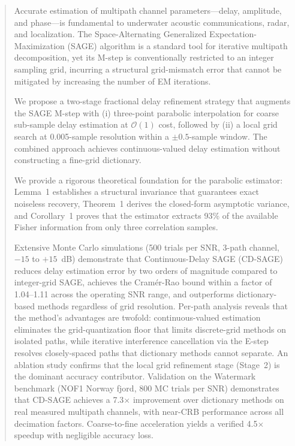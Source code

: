 \documentclass[journal]{IEEEtran}
\newcommand{\bigO}{\mathcal{O}}
\begin{document}
\begin{abstract}
Accurate estimation of multipath channel parameters---delay, amplitude, and phase---is fundamental to underwater acoustic communications, radar, and localization. The Space-Alternating Generalized Expectation-Maximization (SAGE) algorithm is a standard tool for iterative multipath decomposition, yet its M-step is conventionally restricted to an integer sampling grid, incurring a structural grid-mismatch error that cannot be mitigated by increasing the number of EM iterations.

We propose a two-stage fractional delay refinement strategy that augments the SAGE M-step with (i) three-point parabolic interpolation for coarse sub-sample delay estimation at $\bigO(1)$ cost, followed by (ii) a local grid search at 0.005-sample resolution within a $\pm 0.5$-sample window. The combined approach achieves continuous-valued delay estimation without constructing a fine-grid dictionary.

We provide a rigorous theoretical foundation for the parabolic estimator: Lemma~1 establishes a structural invariance that guarantees exact noiseless recovery, Theorem~1 derives the closed-form asymptotic variance, and Corollary~1 proves that the estimator extracts 93\% of the available Fisher information from only three correlation samples.

Extensive Monte Carlo simulations (500 trials per SNR, 3-path channel, $-15$ to $+15$~dB) demonstrate that Continuous-Delay SAGE (CD-SAGE) reduces delay estimation error by two orders of magnitude compared to integer-grid SAGE, achieves the Cram\'{e}r-Rao bound within a factor of 1.04--1.11 across the operating SNR range, and outperforms dictionary-based methods regardless of grid resolution. Per-path analysis reveals that the method's advantages are twofold: continuous-valued estimation eliminates the grid-quantization floor that limits discrete-grid methods on isolated paths, while iterative interference cancellation via the E-step resolves closely-spaced paths that dictionary methods cannot separate. An ablation study confirms that the local grid refinement stage (Stage~2) is the dominant accuracy contributor. Validation on the Watermark benchmark (NOF1 Norway fjord, 800 MC trials per SNR) demonstrates that CD-SAGE achieves a 7.3$\times$ improvement over dictionary methods on real measured multipath channels, with near-CRB performance across all decimation factors. Coarse-to-fine acceleration yields a verified 4.5$\times$ speedup with negligible accuracy loss.
\end{abstract}
\end{document}
